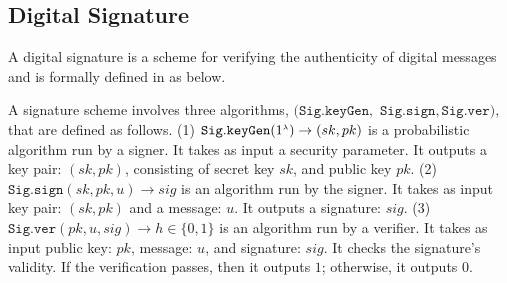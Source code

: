 











\vspace{-1.5mm}

\subsection{Digital Signature}\label{subsec:DS}

A digital signature is a scheme for verifying the authenticity of digital messages and is formally defined in \cite{DBLP:books/crc/KatzLindell2014}  as below.
%
%

\begin{definition}\label{sec::def}
A signature scheme  involves three algorithms, $(\mathtt{Sig.keyGen}, $ $\mathtt{Sig.sign}, \mathtt{Sig.ver})$, that are defined as follows. (1) $\mathtt{Sig.keyGen}(1^{\scriptscriptstyle \lambda})\rightarrow (sk,pk)$ is a probabilistic algorithm run by  a  signer. It takes as input a security parameter. It outputs a key pair: $(sk,pk)$, consisting of secret key $sk$, and public key $pk$. (2) $\mathtt{Sig.sign}(sk, pk, u)\rightarrow sig$ is an algorithm run by the signer. It takes as input  key pair: $(sk,pk)$ and a message: $u$. It outputs a signature: $sig$. (3) $\mathtt{Sig.ver}( pk, u, sig)\rightarrow h\in\{0,1\}$ is an algorithm run by a verifier. It takes as input  public key: $pk$,  message: $u$, and signature: $sig$. It checks the signature's validity.   If the verification passes, then it outputs $1$; otherwise, it outputs $0$. 
\end{definition}

